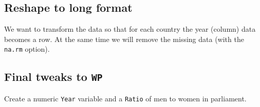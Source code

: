 \documentclass[a4paper,9pt,twocolumn,twoside,printwatermark=false]{pinp}
\begin{document}
\subsection{Reshape to long format}\label{reshape-to-long-format}

We want to transform the data so that for each country the year (column)
data becomes a row. At the same time we will remove the missing data
(with the \texttt{na.rm} option).

\begin{Shaded}
\begin{Highlighting}[]
\StringTok{ }
            \NormalTok{(}\NormalTok{, }\NormalTok{),}
            \NormalTok{(}\NormalTok{),}
            \NormalTok{,}
            \NormalTok{(}\NormalTok{),}
            \NormalTok{)}
\CommentTok{#    ---                               }
\end{Highlighting}
\end{Shaded}

\subsection{\texorpdfstring{Final tweaks to
\texttt{WP}}{Final tweaks to WP}}\label{final-tweaks-to-wp}

Create a numeric \texttt{Year} variable and a \texttt{Ratio} of men to
women in parliament.
\end{document}
